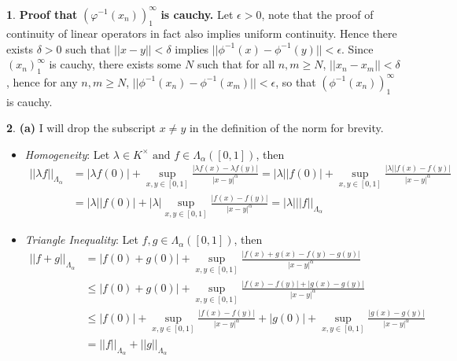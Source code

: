 \documentclass[10.5pt]{article}
\theoremstyle{definition}
\newtheorem{pb}{}
\newcommand{\abs}[1]{\left\vert#1\right\vert}
\newcommand{\norm}[1]{\lvert\lvert#1\rvert\rvert}
\newcommand{\tand}{\text{ and }}
\begin{document}
\begin{pb}
        \textbf{Proof that }\((\varphi^{-1}(x_n))_1^\infty\) \textbf{is cauchy.} Let \(\epsilon > 0\), note that the proof of continuity of linear operators in fact also implies uniform continuity. Hence there exists \(\delta > 0\) such that \(\norm{x-y} < \delta\) implies \(\norm{\phi^{-1}(x) - \phi^{-1}(y)} < \epsilon\). Since \((x_n)_1^\infty\) is cauchy, there exists some \(N\) such that for all \(n,m \geq N\), \(\norm{x_n - x_m} < \delta\), hence for any \(n,m \geq N\), \(\norm{\phi^{-1}(x_n) - \phi^{-1}(x_m)} < \epsilon\), so that \((\phi^{-1}(x_n))_1^\infty\) is cauchy.
        \end{pb}

        \begin{pb}
            \textbf{(a)} I will drop the subscript \(x \neq y\) in the definition of the norm for brevity.
            \begin{itemize}
                \item \emph{Homogeneity}: Let \(\lambda \in K^\times \tand f \in \Lambda_\alpha([0,1])\), then
                \begin{align*}
                    \norm{\lambda f}_{\Lambda_\alpha} &= \abs{\lambda f(0)} + \sup_{x,y \in [0,1]} \frac{\abs{\lambda f(x) - \lambda f(y)}}{\abs{x - y}^\alpha}
                    = \abs{\lambda}\abs{f(0)} + \sup_{x,y \in [0,1]} \frac{\abs{\lambda}\abs{f(x) - f(y)}}{\abs{x - y}^\alpha} \\
                    &= \abs{\lambda}\abs{f(0)} + \abs{\lambda}\sup_{x,y \in [0,1]} \frac{\abs{f(x) - f(y)}}{\abs{x - y}^\alpha} = \abs{\lambda}\norm{f}_{\Lambda_\alpha}
                \end{align*}
                \item \emph{Triangle Inequality}: Let \(f,g \in \Lambda_\alpha([0,1])\), then
                \begin{align*}
                    \norm{f + g}_{\Lambda_\alpha} &= \abs{f(0) + g(0)} + \sup_{x,y \in [0,1]} \frac{\abs{f(x) + g(x) - f(y) - g(y)}}{\abs{x - y}^\alpha} \\
                    &\leq \abs{f(0) + g(0)} + \sup_{x,y \in [0,1]} \frac{\abs{f(x) - f(y)} + \abs{g(x) - g(y)}}{\abs{x - y}^\alpha} \\
                    &\leq \abs{f(0)} + \sup_{x,y \in [0,1]} \frac{\abs{f(x) - f(y)}}{\abs{x - y}^\alpha} + \abs{g(0)} + \sup_{x,y \in [0,1]} \frac{\abs{g(x) - g(y)}}{\abs{x - y}^\alpha} \\
                    &= \norm{f}_{\Lambda_\alpha} + \norm{g}_{\Lambda_\alpha}
                \end{align*}

\end{itemize}
\end{pb}
\end{document}
